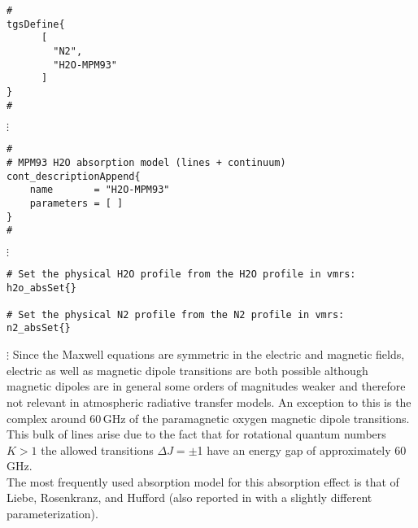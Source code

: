 {

\begin{verbatim}
#
tgsDefine{
      [ 
        "N2",
        "H2O-MPM93"
      ] 
}
#
\end{verbatim}
$\vdots$
\begin{verbatim}
#
# MPM93 H2O absorption model (lines + continuum)
cont_descriptionAppend{
    name       = "H2O-MPM93"
    parameters = [ ]
}
#
\end{verbatim}
$\vdots$
\begin{verbatim}
# Set the physical H2O profile from the H2O profile in vmrs:
h2o_absSet{}

# Set the physical N2 profile from the N2 profile in vmrs:
n2_absSet{}
\end{verbatim}
$\vdots$
%
%
%
%
\label{levelc:02_models}
%
Since the Maxwell equations are symmetric in the electric and
magnetic fields, electric as well as magnetic dipole transitions 
are both possible although magnetic dipoles are in general some
orders of magnitudes weaker and therefore not relevant in
atmospheric radiative transfer models. An exception to this is the complex 
around 60\,GHz of the paramagnetic oxygen magnetic dipole transitions. 
This bulk of lines arise due to the fact that for rotational 
quantum numbers $K>1$ the allowed transitions \mbox{$\Delta J = \pm$1} 
have an energy gap of approximately 60\,GHz.\\
The most frequently used absorption model for this absorption effect is that of
Liebe, Rosenkranz, and Hufford \cite{liebeetal:92} (also reported in 
\cite{pwr:93} with a slightly different parameterization).

}
